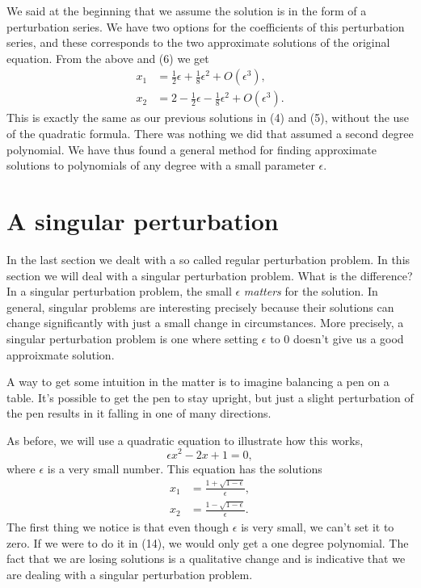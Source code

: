 \documentclass[12pt]{article}
\begin{document}
We said at the beginning that we assume the solution is in the form of
a perturbation series. We have two options for the coefficients of
this perturbation series, and these corresponds to the two approximate
solutions of the original equation. From the above and (6) we get
\begin{align}
x_1 &= \frac{1}{2} \epsilon + \frac{1}{8} \epsilon^2 + O(\epsilon^3), \\
x_2 &= 2 - \frac{1}{2} \epsilon - \frac{1}{8} \epsilon^2 + O(\epsilon^3).
\end{align}
This is exactly the same as our previous solutions in (4) and (5),
without the use of the quadratic formula. There was nothing we did
that assumed a second degree polynomial. We have thus found a general
method for finding approximate solutions to polynomials of any degree
with a small parameter $\epsilon$.

\newpage
\section{A singular perturbation}

In the last section we dealt with a so called regular perturbation
problem. In this section we will deal with a singular perturbation
problem. What is the difference? In a singular perturbation problem,
the small $\epsilon$ \textit{matters} for the solution. In general,
singular problems are interesting precisely because their solutions
can change significantly with just a small change in
circumstances. More precisely, a singular perturbation problem is one
where setting $\epsilon$ to 0 doesn't give us a good approixmate
solution.

A way to get some intuition in the matter is to imagine balancing a
pen on a table. It's possible to get the pen to stay upright, but just
a slight perturbation of the pen results in it falling in one of many
directions.

As before, we will use a quadratic equation to illustrate how this
works,
\begin{equation}
\epsilon x^2 - 2 x + 1 = 0,
\end{equation}
where $\epsilon$ is a very small number. This equation has the
solutions
\begin{align}
x_1 &= \frac{1 + \sqrt{1 - \epsilon}}{\epsilon}, \\
x_2 &= \frac{1 - \sqrt{1 - \epsilon}}{\epsilon}.
\end{align}
The first thing we notice is that even though $\epsilon$ is very
small, we can't set it to zero. If we were to do it in (14), we would
only get a one degree polynomial. The fact that we are losing
solutions is a qualitative change and is indicative that we are
dealing with a singular perturbation problem.
\end{document}
